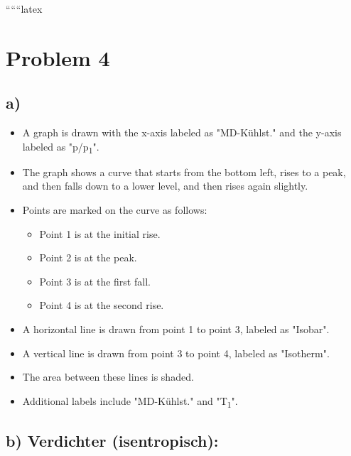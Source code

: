 
``````latex


\section*{Problem 4}

\subsection*{a)}

\begin{itemize}
    \item A graph is drawn with the x-axis labeled as "MD-Kühlst." and the y-axis labeled as "p/p\textsubscript{1}". 
    \item The graph shows a curve that starts from the bottom left, rises to a peak, and then falls down to a lower level, and then rises again slightly.
    \item Points are marked on the curve as follows:
        \begin{itemize}
            \item Point 1 is at the initial rise.
            \item Point 2 is at the peak.
            \item Point 3 is at the first fall.
            \item Point 4 is at the second rise.
        \end{itemize}
    \item A horizontal line is drawn from point 1 to point 3, labeled as "Isobar".
    \item A vertical line is drawn from point 3 to point 4, labeled as "Isotherm".
    \item The area between these lines is shaded.
    \item Additional labels include "MD-Kühlst." and "T\textsubscript{1}".
\end{itemize}

\subsection*{b) Verdichter (isentropisch):}

